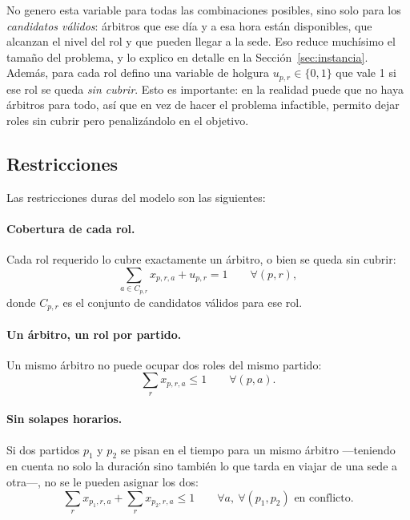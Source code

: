 \documentclass[11pt,a4paper,spanish]{book}
\numberwithin{equation}{chapter}
\numberwithin{figure}{chapter}
\numberwithin{table}{chapter}
\begin{document}
No genero esta variable para todas las combinaciones posibles, sino solo para los \emph{candidatos válidos}: árbitros que ese día y a esa hora están disponibles, que alcanzan el nivel del rol y que pueden llegar a la sede. Eso reduce muchísimo el tamaño del problema, y lo explico en detalle en la Sección~\ref{sec:instancia}. Además, para cada rol defino una variable de holgura $u_{p,r}\in\{0,1\}$ que vale 1 si ese rol se queda \emph{sin cubrir}. Esto es importante: en la realidad puede que no haya árbitros para todo, así que en vez de hacer el problema infactible, permito dejar roles sin cubrir pero penalizándolo en el objetivo.

\subsection{Restricciones}

Las restricciones duras del modelo son las siguientes:

\paragraph{Cobertura de cada rol.} Cada rol requerido lo cubre exactamente un árbitro, o bien se queda sin cubrir:
\begin{equation}
\sum_{a \in C_{p,r}} x_{p,r,a} + u_{p,r} = 1 \qquad \forall (p,r),
\label{eq:cobertura}
\end{equation}
donde $C_{p,r}$ es el conjunto de candidatos válidos para ese rol.

\paragraph{Un árbitro, un rol por partido.} Un mismo árbitro no puede ocupar dos roles del mismo partido:
\begin{equation}
\sum_{r} x_{p,r,a} \le 1 \qquad \forall (p,a).
\end{equation}

\paragraph{Sin solapes horarios.} Si dos partidos $p_1$ y $p_2$ se pisan en el tiempo para un mismo árbitro —teniendo en cuenta no solo la duración sino también lo que tarda en viajar de una sede a otra—, no se le pueden asignar los dos:
\begin{equation}
\sum_{r} x_{p_1,r,a} + \sum_{r} x_{p_2,r,a} \le 1 \qquad \forall a, \ \forall (p_1,p_2) \text{ en conflicto}.
\end{equation}
\end{document}
